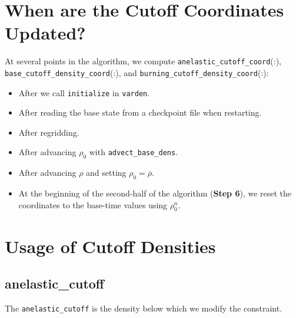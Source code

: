 \section{When are the Cutoff Coordinates Updated?}

At several points in the algorithm, we compute {\tt anelastic\_cutoff\_coord}(:), 
{\tt base\_cutoff\_density\_coord}(:), and {\tt burning\_cutoff\_density\_coord}(:):

\begin{itemize}

\item After we call {\tt initialize} in {\tt varden}.

\item After reading the base state from a checkpoint file when restarting.

\item After regridding.

\item After advancing $\rho_0$ with {\tt advect\_base\_dens}.

\item After advancing $\rho$ and setting $\rho_0 = \overline{\rho}$.

\item At the beginning of the second-half of the algorithm ({\bf Step 6}), we reset
  the coordinates to the base-time values using $\rho_0^n$.

\end{itemize}

\section{Usage of Cutoff Densities}

\subsection{anelastic\_cutoff}\label{Sec:Anelastic Cutoff}

The {\tt anelastic\_cutoff} is the density below which we modify the constraint.


